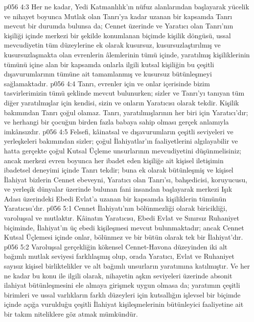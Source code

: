 \vs p056 4:3 Her ne kadar, Yedi Katmanlılık’ın nüfuz alanlarından başlayarak yücelik ve nihayet boyunca Mutlak olan Tanrı’ya kadar uzanan bir kapsamda Tanrı mevcut bir durumda bulunsa da; Cennet üzerinde ve Yaratıcı olan Tanrı’nın kişiliği içinde merkezi bir şekilde konumlanan biçimde kişilik döngüsü, ussal mevcudiyetin tüm düzeylerine ek olarak kusursuz, kusursuzlaştırılmış ve kusursuzlaşmakta olan evrenlerin âlemlerinin tümü içinde, yaratılmış kişiliklerinin tümünü içine alan bir kapsamda onlarla ilgili kutsal kişiliğin bu çeşitli dışavurumlarının tümüne ait tamamlanmış ve kusursuz bütünleşmeyi sağlamaktadır.
\vs p056 4:4 Tanrı, evrenler için ve onlar içerisinde bizim tasvirlerimizin tümü şeklinde mevcut bulunurken; sizler ve Tanrı’yı tanıyan tüm diğer yaratılmışlar için kendisi, sizin ve onların Yaratıcısı olarak tekdir. Kişilik bakımından Tanrı çoğul olamaz. Tanrı, yaratılmışlarının her biri için Yaratıcı’dır; ve herhangi bir çocuğun birden fazla babaya sahip olması gerçek anlamıyla imkânsızdır.
\vs p056 4:5 Felsefi, kâinatsal ve dışavurumların çeşitli seviyeleri ve yerleşkeleri bakımından sizler; çoğul İlahiyatlar’ın faaliyetlerini algılayabilir ve hatta gerçekte çoğul Kutsal Üçleme unsurlarının mevcudiyetini düşünmelisiniz; ancak merkezi evren boyunca her ibadet eden kişiliğe ait kişisel iletişimin ibadetsel deneyimi içinde Tanrı tekdir; buna ek olarak bütünleşmiş ve kişisel İlahiyat bizlerin Cennet ebeveyni, Yaratıcı olan Tanrı’sı, bahşedicisi, koruyucusu, ve yerleşik dünyalar üzerinde bulunan fani insandan başlayarak merkezi Işık Adası üzerindeki Ebedi Evlat’a uzanan bir kapsamda kişiliklerin tümünün Yaratıcısı’dır.
\vs p056 5:1 Cennet İlahiyatı’nın bölünmezliği olarak biricikliği, varoluşsal ve mutlaktır. Kâinatın Yaratıcısı, Ebedi Evlat ve Sınırsız Ruhaniyet biçiminde, İlahiyat’ın üç ebedi kişileşmesi mevcut bulunmaktadır; ancak Cennet Kutsal Üçlemesi içinde onlar,  bölünmez ve bir bütün olarak tek bir İlahiyat’dır.
\vs p056 5:2 Varoluşsal gerçekliğin kökensel Cennet\hyp{}Havona düzeyinden iki alt bağımlı mutlak seviyesi farklılaşmış olup, orada Yaratıcı, Evlat ve Ruhaniyet sayısız kişisel birliktelikler ve alt bağımlı unsurların yaratımına katılmıştır. Ve her ne kadar bu konu ile ilgili olarak, nihayetin aşkın seviyeleri üzerinde absonit ilahiyat bütünleşmesini ele almaya girişmek uygun olmasa da; yaratımın çeşitli birimleri ve ussal varlıkların farklı düzeyleri için kutsallığın işlevsel bir biçimde içinde açığa vurulduğu çeşitli İlahiyat kişileşmelerinin bütünleyici faaliyetine ait bir takım niteliklere göz atmak mümkündür.
